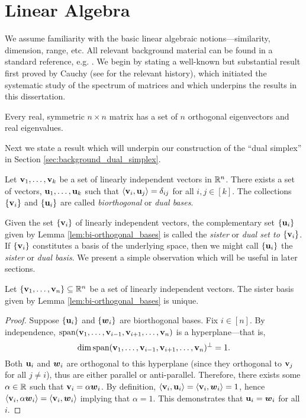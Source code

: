 \section{Linear Algebra}
\label{sec:background_linear} 
We assume familiarity with the basic linear algebraic notions---similarity, dimension, range, etc. All relevant background material can be found in a standard reference, e.g. \cite{axler1997linear}. 
We begin by stating a well-known but substantial result first proved by Cauchy (see \cite{hawkins1975cauchy} for the relevant history), which initiated the systematic study of the spectrum of matrices and which underpins the results in this dissertation. 

\begin{theorem}
	\label{thm:spectral_theorem}
	Every real, symmetric $n\times n$ matrix has a set of $n$ orthogonal eigenvectors and real eigenvalues.  
\end{theorem}

Next we state a result which will underpin our construction of the ``dual simplex'' in Section \ref{sec:background_dual_simplex}. 

\begin{lemma}
\label{lem:bi-orthogonal_bases}
Let $\vb{v}_1,\dots,\vb{v}_k$ be a set of linearly independent vectors in $\mathbb{R}^n$. There exists a set of vectors, $\vb{u}_1,\dots,\vb{u}_k$ such that $\langle \vb{v}_i,\vb{u}_j\rangle = \delta_{ij}$ for all $i,j\in[k]$. The collections $\{\vb{v}_i\}$ and $\{\vb{u}_i\}$ are called \emph{biorthogonal} or \emph{dual bases}.  
\end{lemma}

Given the set $\{\vb{v}_i\}$ of linearly independent vectors, the complementary set $\{\vb{u}_i\}$ given by Lemma \ref{lem:bi-orthogonal_bases} is called the \emph{sister} or \emph{dual set to $\{\vb{v}_i\}$}. If $\{\vb{v}_i\}$ constitutes a basis of the underlying space, then we might call $\{\vb{u}_i\}$ the \emph{sister} or \emph{dual basis}.  We present a simple observation which will be useful in later sections. 

\begin{observation}
\label{obs:bi-orthogonal_unique}
Let $\{\vb{v}_1,\dots,\vb{v}_n\}\subseteq\mathbb{R}^n$ be a set of linearly independent vectors. The sister basis given by Lemma \ref{lem:bi-orthogonal_bases} is unique. 
\end{observation}
\begin{proof}
Suppose $\{\vb{u}_i\}$ and $\{\vb*{w}_i\}$ are biorthogonal bases. Fix $i\in[n]$. By independence, $\textnormal{span}(\vb{v}_1,\dots,\vb{v}_{i-1},\vb{v}_{i+1},\dots,\vb{v}_n)$ is a hyperplane---that is, \[\dim\textnormal{span}(\vb{v}_1,\dots,\vb{v}_{i-1},\vb{v}_{i+1},\dots,\vb{v}_n)^\perp=1.\] Both $\vb{u}_i$ and $\vb*{w}_i$ are orthogonal to this hyperplane (since they orthogonal to $\vb{v}_j$ for all $j\neq i$), thus are either parallel or anti-parallel. Therefore, there exists some $\alpha\in\mathbb{R}$ such that $\vb{v}_i=\alpha\vb*{w}_i$. By definition, $\langle \vb{v}_i,\vb{u}_i\rangle = \langle \vb{v}_i,\vb*{w}_i\rangle =1$, hence $\langle \vb{v}_i,\alpha \vb*{w}_i\rangle = \langle \vb{v}_i,\vb*{w}_i\rangle$ implying that $\alpha=1$. This demonstrates that $\vb{u}_i=\vb*{w}_i$ for all $i$. 
\end{proof}

